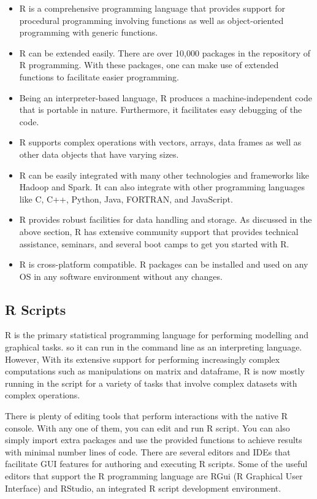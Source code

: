 \documentclass[
]{book}
\providecommand{\tightlist}{%
  \setlength{\itemsep}{0pt}\setlength{\parskip}{0pt}}
\begin{document}
\begin{itemize}
\tightlist
\item
  R is a comprehensive programming language that provides support for procedural programming involving functions as well as object-oriented programming with generic functions.
\item
  R can be extended easily. There are over 10,000 packages in the repository of R programming. With these packages, one can make use of extended functions to facilitate easier programming.
\item
  Being an interpreter-based language, R produces a machine-independent code that is portable in nature. Furthermore, it facilitates easy debugging of the code.
\item
  R supports complex operations with vectors, arrays, data frames as well as other data objects that have varying sizes.
\item
  R can be easily integrated with many other technologies and frameworks like Hadoop and Spark. It can also integrate with other programming languages like C, C++, Python, Java, FORTRAN, and JavaScript.
\item
  R provides robust facilities for data handling and storage.
  As discussed in the above section, R has extensive community support that provides technical assistance, seminars, and several boot camps to get you started with R.
\item
  R is cross-platform compatible. R packages can be installed and used on any OS in any software environment without any changes.
\end{itemize}

\hypertarget{r-scripts}{%
\subsection*{R Scripts}\label{r-scripts}}


R is the primary statistical programming language for performing modelling and graphical tasks. so it can run in the command line as an interpreting language. However, With its extensive support for performing increasingly complex computations such as manipulations on matrix and dataframe, R is now mostly running in the script for a variety of tasks that involve complex datasets with complex operations.

There is plenty of editing tools that perform interactions with the native R console. With any one of them, you can edit and run R script. You can also simply import extra packages and use the provided functions to achieve results with minimal number lines of code. There are several editors and IDEs that facilitate GUI features for authoring and executing R scripts. Some of the useful editors that support the R programming language are RGui (R Graphical User Interface) and RStudio, an integrated R script development environment.
\end{document}
